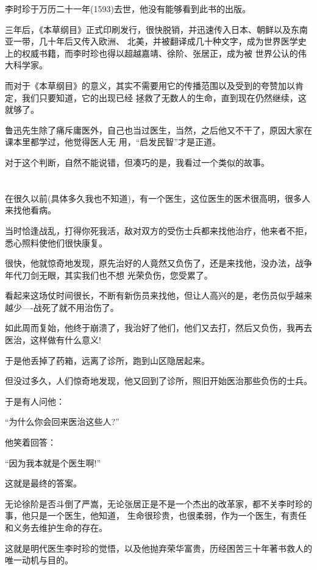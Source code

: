 \documentclass[11pt,a4paper,onecolumn]{article}
\begin{document}
李时珍于万历二十一年(1593)去世，他没有能够看到此书的出版。

三年后，《本草纲目》正式印刷发行，很快脱销，并迅速传入日本、朝鲜以及东南亚一带，几十年后又传入欧洲、
北美，并被翻译成几十种文字，成为世界医学史上的权威书籍，而李时珍也得以超越嘉靖、徐阶、张居正，成为被
世界公认的伟大科学家。

而对于《本草纲目》的意义，其实不需要用它的传播范围以及受到的夸赞加以肯定，我们只要知道，它的出现已经
拯救了无数人的生命，直到现在仍然继续，这就够了。

鲁迅先生除了痛斥庸医外，自己也当过医生，当然，之后他又不干了，原因大家在课本里都学过，他觉得医人无
用，``启发民智''才是正道。

对于这个判断，自然不能说错，但凑巧的是，我看过一个类似的故事。

\section[\thesection]{}

在很久以前(具体多久我也不知道)，有一个医生，这位医生的医术很高明，很多人来找他看病。

当时恰逢战乱，打得你死我活，敌对双方的受伤士兵都来找他治疗，他来者不拒，悉心照料使他们很快康复。

很快，他就惊奇地发现，原先治好的人竟然又负伤了，还是来找他，没办法，战争年代刀剑无眼，其实我们也不想
光荣负伤，您受累了。

看起来这场仗时间很长，不断有新伤员来找他，但让人高兴的是，老伤员似乎越来越少----战死了就不用治伤了。

如此周而复始，他终于崩溃了，我治好了他们，他们又去打，然后又负伤，我再去医治，这样做有什么意义!

于是他丢掉了药箱，远离了诊所，跑到山区隐居起来。

但没过多久，人们惊奇地发现，他又回到了诊所，照旧开始医治那些负伤的士兵。

于是有人问他：

``为什么你会回来医治这些人?''

他笑着回答：

``因为我本就是个医生啊!''

这就是最终的答案。

无论徐阶是否斗倒了严嵩，无论张居正是不是一个杰出的改革家，都不关李时珍的事，他只是一个医生，他知道，
生命很珍贵，也很柔弱，作为一个医生，有责任和义务去维护生命的存在。

这就是明代医生李时珍的觉悟，以及他抛弃荣华富贵，历经困苦三十年著书救人的唯一动机与目的。
\end{document}
